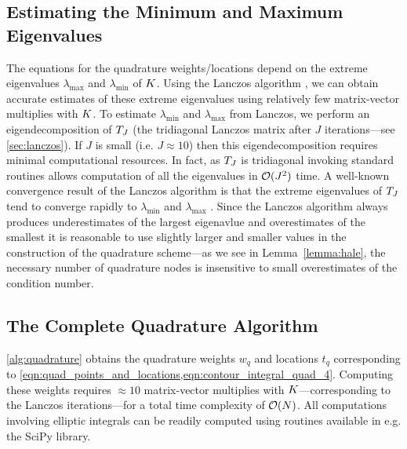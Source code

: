\subsection{Estimating the Minimum and Maximum Eigenvalues}
The equations for the quadrature weights/locations depend on the extreme eigenvalues $\lambda_\text{max}$ and $\lambda_\text{min}$ of $K$.
Using the Lanczos algorithm \cite{lanczos1950iteration}, we can obtain accurate estimates of these extreme eigenvalues using relatively few matrix-vector multiplies with $K$.
To estimate $\lambda_\text{min}$ and $\lambda_\text{max}$ from Lanczos, we perform an eigendecomposition of $T_J$ (the tridiagonal Lanczos matrix after $J$ iterations---see \cref{sec:lanczos}).
If $J$ is small (i.e. $J \approx 10$) then this eigendecomposition requires minimal computational resources. In fact, as $T_J$ is tridiagonal invoking standard routines allows computation of all the eigenvalues in $\bigo{J^2}$ time.
A well-known convergence result of the Lanczos algorithm is that the extreme eigenvalues of $T_J$ tend to converge rapidly to $\lambda_\text{min}$ and $\lambda_\text{max}$ \citep[e.g.][]{saad2003iterative,golub2012matrix}.
Since the Lanczos algorithm always produces underestimates of the largest eigenavlue and overestimates of the smallest it is reasonable to use slightly larger and smaller values in the construction of the quadrature scheme---as we see in Lemma~\ref{lemma:hale}, the necessary number of quadrature nodes is insensitive to small overestimates of the condition number.


\subsection{The Complete Quadrature Algorithm}
\cref{alg:quadrature} obtains the quadrature weights $w_q$ and locations $t_q$ corresponding to \cref{eqn:quad_points_and_locations,eqn:contour_integral_quad_4}.
Computing these weights requires $\approx 10$ matrix-vector multiplies with $K$---corresponding to the Lanczos iterations---for a total time complexity of $\bigo{N}$.
All computations involving elliptic integrals can be readily computed using routines available in e.g. the SciPy library.


